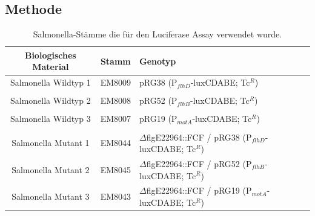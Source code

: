 \documentclass[oneside,10pt,a4paper]{report}
\begin{document}
			
			\subsection{Methode}
				\begin{table}[H]
				\centering
				\caption{Salmonella-Stämme die für den Luciferase Assay verwendet wurde.}
				\label{tab: exp6-biologisches Material part2}
				\begin{tabular}{ccp{7.5cm}}
					\toprule
					Biologisches Material& Stamm & Genotyp\\
					\midrule
					\multirow{2}{*}{\parbox[t]{2cm}{Salmonella Wildtyp 1 }}  & \multirow{2}{*}{EM8009} & \multirow{2}{*}{\parbox[t]{7.5cm}{pRG38 (P$_{flhD}$-luxCDABE; Tc$^R$)}}\\
					&&\\
					&&\\
					\multirow{2}{*}{\parbox[t]{2cm}{Salmonella Wildtyp 2}}  & \multirow{2}{*}{EM8008} & \multirow{2}{*}{\parbox[t]{7.5cm}{pRG52 (P$_{flhB}$-luxCDABE; Tc$^R$)}}\\
					&&\\
					&&\\
					\multirow{2}{*}{\parbox[t]{2cm}{Salmonella Wildtyp 3}}  & \multirow{2}{*}{EM8007} & \multirow{2}{*}{\parbox[t]{7.5cm}{pRG19 (P$_{motA}$-luxCDABE; Tc$^R$)}}\\
					&&\\
					&&\\
					\multirow{3}{*}{\parbox[t]{2cm}{Salmonella Mutant 1}} & \multirow{3}{*}{EM8044} &\multirow{3}{*}{\parbox[t]{7.5cm}{$\Delta$flgE22964::FCF / pRG38 (P$_{flhD}$-luxCDABE; Tc$^R$)}} \\
					&&\\
					&&\\
					\multirow{3}{*}{\parbox[t]{2cm}{Salmonella Mutant 2}} & \multirow{3}{*}{EM8045} &\multirow{3}{*}{\parbox[t]{7.5cm}{$\Delta$flgE22964::FCF / pRG52 (P$_{flhB}$-luxCDABE; Tc$^R$)}} \\
					&&\\
					&&\\
					\multirow{3}{*}{\parbox[t]{2cm}{Salmonella Mutant 3}} & \multirow{3}{*}{EM8043} &\multirow{3}{*}{\parbox[t]{7.5cm}{$\Delta$flgE22964::FCF / pRG19 (P$_{motA}$-luxCDABE; Tc$^R$)}} \\
					&&\\
					&&\\
					
					\bottomrule			
				\end{tabular}
			\end{table}
			
\end{document}
